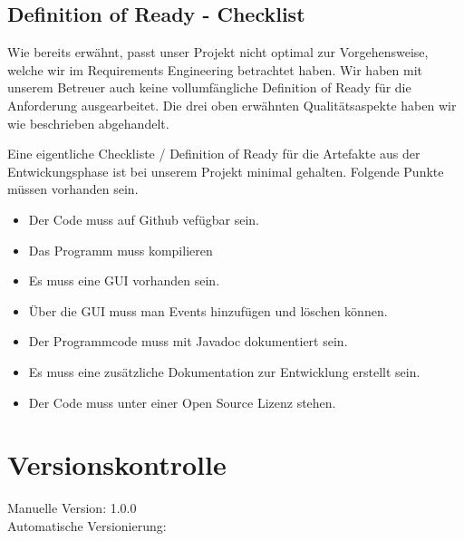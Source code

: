 \documentclass[11pt,titelpage]{scrartcl}
\begin{document}
\subsection{Definition of Ready - Checklist}
Wie bereits erwähnt, passt unser Projekt nicht optimal zur Vorgehensweise, welche wir im Requirements Engineering
betrachtet haben. Wir haben mit unserem Betreuer auch keine vollumfängliche Definition of Ready für die Anforderung
ausgearbeitet. Die drei oben erwähnten Qualitätsaspekte haben wir wie beschrieben abgehandelt.


Eine eigentliche Checkliste / Definition of Ready für die Artefakte aus der Entwickungsphase ist bei unserem Projekt
minimal gehalten.
Folgende Punkte müssen vorhanden sein.
\begin{itemize}
\item Der Code muss auf Github vefügbar sein.
 \item Das Programm muss kompilieren
 \item Es muss eine GUI vorhanden sein.
 \item Über die GUI muss man Events hinzufügen und löschen können.
 \item Der Programmcode muss mit Javadoc dokumentiert sein.
 \item Es muss eine zusätzliche Dokumentation zur Entwicklung erstellt sein.
 \item Der Code muss unter einer Open Source Lizenz stehen.
\end{itemize}


\section{Versionskontrolle}
Manuelle Version: 1.0.0
\\

\noindent
Automatische Versionierung:
\immediate{}

\immediate{}
\end{document}
